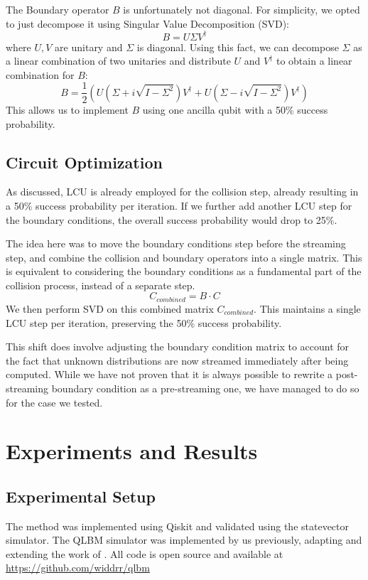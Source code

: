 \documentclass[preprint,12pt,authoryear]{elsarticle}
\begin{document}
The Boundary operator $B$ is unfortunately not diagonal.
For simplicity, we opted to just decompose it using Singular Value Decomposition (SVD):
\begin{equation}
    B = U \Sigma V^{\dagger}
\end{equation}
where $U, V$ are unitary and $\Sigma$ is diagonal. Using this fact, we can decompose $\Sigma$ as a linear combination of two unitaries and distribute $U$ and $V^{\dagger}$ to obtain a linear combination for $B$:
\begin{equation}
    B = \frac{1}{2} (U (\Sigma + i\sqrt{I - \Sigma^2}) V^{\dagger} + U (\Sigma - i\sqrt{I - \Sigma^2}) V^{\dagger})
\end{equation}
This allows us to implement $B$ using one ancilla qubit with a 50\% success probability.

\subsection{Circuit Optimization}
As discussed, LCU is already employed for the collision step, already resulting in a 50\% success probability per iteration.
If we further add another LCU step for the boundary conditions, the overall success probability would drop to 25\%.

The idea here was to move the boundary conditions step before the streaming step, and combine the collision and boundary operators into a single matrix.
This is equivalent to considering the boundary conditions as a fundamental part of the collision process, instead of a separate step.
\begin{equation}
    C_{combined} =  B \cdot C
\end{equation}
We then perform SVD on this combined matrix $C_{combined}$. This maintains a single LCU step per iteration, preserving the 50\% success probability.

This shift does involve adjusting the boundary condition matrix to account for the fact that unknown distributions are now streamed immediately after being computed.
While we have not proven that it is always possible to rewrite a post-streaming boundary condition as a pre-streaming one, we have managed to do so for the case we tested.

\section{Experiments and Results}
\label{sec:exp}


\subsection{Experimental Setup}
The method was implemented using Qiskit \citep{qiskit2024} and validated using the statevector simulator.
The QLBM simulator was implemented by us previously, adapting and extending the work of \cite{wawrzyniak2025base}.
All code is open source and available at \url{https://github.com/widdrr/qlbm}
\end{document}

